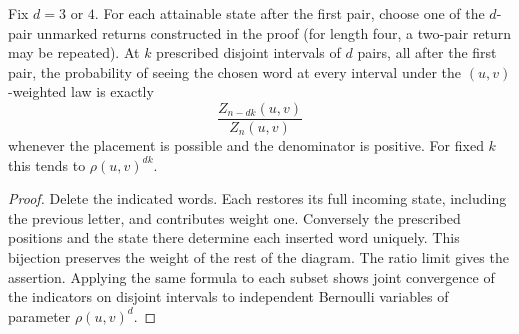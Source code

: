 \begin{corollary}
Fix \(d=3\) or \(4\). For each attainable state after the first pair,
choose one of the \(d\)-pair unmarked returns constructed in the proof
(for length four, a two-pair return may be repeated). At \(k\)
prescribed disjoint intervals of \(d\) pairs, all after the first
pair, the probability of seeing the chosen word at every interval
under the \((u,v)\)-weighted law is exactly
\[
                    \frac{Z_{n-dk}(u,v)}{Z_n(u,v)}
\]
whenever the placement is possible and the denominator is positive.
For fixed \(k\) this tends to \(\rho(u,v)^{dk}\).
\end{corollary}
\begin{proof}
Delete the indicated words. Each restores its full incoming state,
including the previous letter, and contributes weight one.
Conversely the prescribed positions and the state there determine
each inserted word uniquely. This bijection preserves the weight of
the rest of the diagram. The ratio limit gives the assertion. Applying
the same formula to each subset shows joint convergence of the indicators
on disjoint intervals to independent Bernoulli variables of parameter
\(\rho(u,v)^d\).
\end{proof}
